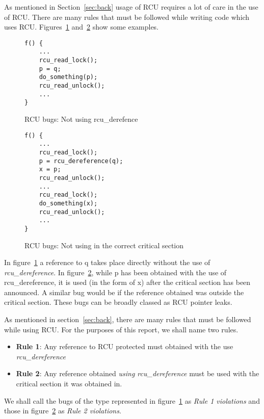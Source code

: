 As mentioned in Section~\ref{sec:back} usage of RCU requires a lot of care in
the use of RCU. There are many rules that must be followed while writing code
which uses RCU. Figures~\ref{fig:rcuderefbug} and~\ref{fig:rcuusebug} show
some examples.

\begin{figure}[h]
\centering
\begin{lstlisting}
f() {
	...
	rcu_read_lock();
	p = q;
	do_something(p);
	rcu_read_unlock();
	...
}
\end{lstlisting}
\caption{RCU bugs: Not using rcu\_derefence}\label{fig:rcuderefbug}
\end{figure}

\begin{figure}[h]
\centering
\begin{lstlisting}
f() {
	...
	rcu_read_lock();
	p = rcu_dereference(q);
	x = p;
	rcu_read_unlock();
	...
	rcu_read_lock();
	do_something(x);
	rcu_read_unlock();
	...
}
\end{lstlisting}
\caption{RCU bugs: Not using in the correct critical section}\label{fig:rcuusebug}
\end{figure}

In figure~\ref{fig:rcuderefbug} a reference to q takes place directly without the use
of \emph{rcu\_dereference}. In figure~\ref{fig:rcuusebug}, while p has been obtained with the
use of rcu\_dereference, it is used (in the form of x) after the critical section
has been announced. A similar bug would be if the reference obtained was outside the
critical section. These bugs can be broadly classed as RCU pointer leaks.

As mentioned in section~\ref{sec:back}, there are many rules that must be followed
while using RCU. For the purposes of this report, we shall name two rules.
\begin{itemize}
\item{\bf Rule 1}: Any reference to RCU protected must obtained with the use \emph{rcu\_dereference}
\item{\bf Rule 2}: Any reference obtained \emph{using rcu\_dereference} must be used with the critical section it was obtained in.
\end{itemize}

We shall call the bugs of the type represented in figure~\ref{fig:rcuderefbug} as \emph{Rule 1 violations}
and those in figure~\ref{fig:rcuusebug} as \emph{Rule 2 violations}.
